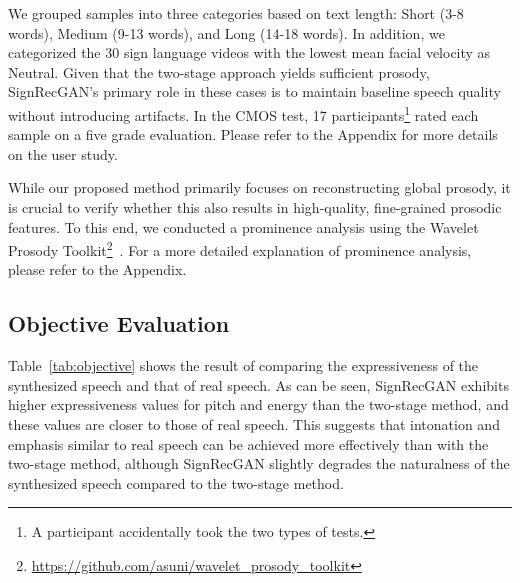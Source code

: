 We grouped samples into three categories based on text length: Short (3-8 words), Medium (9-13 words), and Long (14-18 words). 
In addition, we categorized the 30 sign language videos with the lowest mean facial velocity as Neutral. 
Given that the two-stage approach yields sufficient prosody, SignRecGAN's primary role in these cases is to maintain baseline speech quality without introducing artifacts.
In the CMOS test, 17 participants\footnote{A participant accidentally took the two types of tests.} rated each sample on a five grade evaluation.
Please refer to the Appendix for more details on the user study.

While our proposed method primarily focuses on reconstructing global prosody, it is crucial to verify whether this also results in high-quality, fine-grained prosodic features. 
To this end, we conducted a prominence analysis using the Wavelet Prosody Toolkit\footnote{\url{https://github.com/asuni/wavelet_prosody_toolkit}}~\cite{DBLP:journals/corr/SuniAV15}. For a more detailed explanation of prominence analysis,
please refer to the Appendix.



\subsection{Objective Evaluation}
Table~\ref{tab:objective} shows the result of comparing the expressiveness of the synthesized speech and that of real speech. 
As can be seen, SignRecGAN exhibits higher expressiveness values for pitch and energy than the two-stage method, 
and these values are closer to those of real speech. 
This suggests that intonation and emphasis similar to real speech can be achieved more effectively than with the two-stage method, 
although SignRecGAN slightly degrades the naturalness of the synthesized speech compared to the two-stage method.

